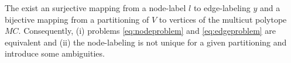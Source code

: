 \documentclass[10pt,twocolumn,letterpaper]{article}
\DeclareMathOperator*{\argmin}{arg\,min}
\begin{document}
The exist an surjective mapping from a node-label $l$ to edge-labeling $y$ and
a bijective mapping from a partitioning of $V$ to vertices of the multicut polytope $MC$.
Consequently, 
(i) problems \ref{eq:nodeproblem} and \ref{eq:edgeproblem} are equivalent
and (ii) the node-labeling is not unique for a given partitioning and introduce some
ambiguities.







\end{document}
